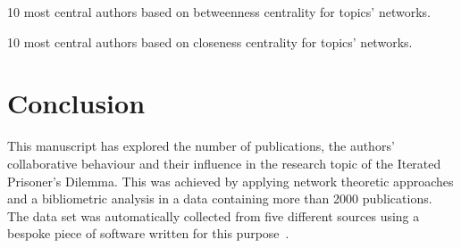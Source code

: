 \documentclass{article}
\theoremstyle{definition}
\begin{document}
\begin{table}[!hbtp]
    \begin{center}
    \resizebox{.9\textwidth}{!}{}
\end{center}
\caption{10 most central authors based on betweenness centrality
for topics' networks.}\label{table:central_authors_bc_topics}
\end{table}

\begin{table}[!hbtp]
    \begin{center}
    \resizebox{.9\textwidth}{!}{}
\end{center}
\caption{10 most central authors based on closeness centrality
for topics' networks.}\label{table:central_authors_cc_topics}
\end{table}



\section{Conclusion}

This manuscript has explored the number of publications, the authors'
collaborative behaviour and their influence in the research topic of the Iterated
Prisoner's Dilemma. This was achieved by applying network theoretic approaches and
a bibliometric analysis in a data containing more than 2000 publications.
The data set was automatically
collected from five different sources using a bespoke piece of software written
for this purpose~\cite{nikoleta_2017}.
\end{document}
